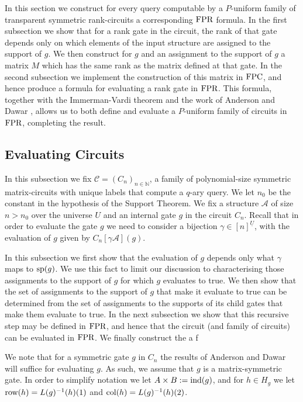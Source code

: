 \documentclass[../paper.tex]{subfiles}
\begin{document}
In this section we construct for every query computable by a $P$-uniform family
of transparent symmetric rank-circuits a corresponding $\text{\upshape FPR}$ formula. In the
first subsection we show that for a rank gate in the circuit, the rank of that
gate depends only on which elements of the input structure are assigned to the
support of $g$. We then construct for $g$ and an assignment to the support of
$g$ a matrix $M$ which has the same rank as the matrix defined at that gate. In
the second subsection we implement the construction of this matrix in $\text{\upshape FPC}$,
and hence produce a formula for evaluating a rank gate in $\text{\upshape FPR}$. This formula,
together with the Immerman-Vardi theorem and the work of Anderson and Dawar
\cite{AndersonD17}, allows us to both define and evaluate a $P$-uniform family
of circuits in $\text{\upshape FPR}$, completing the result.

\subsection {Evaluating Circuits}
In this subsection we fix $\mathcal{C} = (C_n)_{n \in \mathbb{N}}$, a family of
polynomial-size symmetric matrix-circuits with unique labels that compute a
$q$-ary query. We let $n_0$ be the constant in the hypothesis of the Support
Theorem. We fix a structure $\mathcal{A}$ of size $n > n_0$ over the universe
$U$ and an internal gate $g$ in the circuit $C_n$. Recall that in order to
evaluate the gate $g$ we need to consider a bijection $\gamma \in
[n]^{\underline{U}}$, with the evaluation of $g$ given by $C_n[\gamma
\mathcal{A}](g)$.

In this subsection we first show that the evaluation of $g$ depends only what
$\gamma$ maps to $\text{sp}(g)$. We use this fact to limit our discussion to
characterising those assignments to the support of $g$ for which $g$ evaluates
to true. We then show that the set of assignments to the support of $g$ that
make it evaluate to true can be determined from the set of assignments to the
supports of its child gates that make them evaluate to true. In the next
subsection we show that this recursive step may be defined in $\text{\upshape FPR}$, and hence
that the circuit (and family of circuits) can be evaluated in $\text{\upshape FPR}$. We finally
construct the a f


We note that for a symmetric gate $g$ in $C_n$ the results of Anderson and
Dawar~\cite{AndersonD17} will suffice for evaluating $g$. As such, we assume
that $g$ is a matrix-symmetric gate. In order to simplify notation we let $A
\times B := \text{\upshape ind}(g)$, and for $h \in H_g$ we let $\text{row}(h) = L(g)^{-1}(h)(1)$ and
$\text{col}(h) = L(g)^{-1}(h)(2)$.
\end{document}
